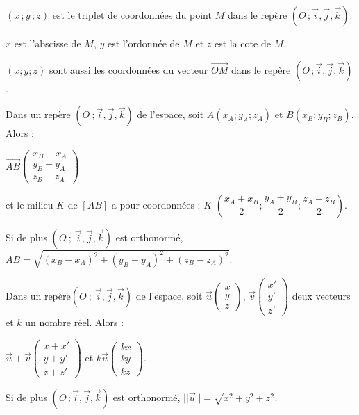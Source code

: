 \documentclass{cornouaille}
\begin{document}
\begin{definition}
  $(x\,;y\,;z)$ est le triplet de coordonnées du
  point $M$ dans le repère $(O\,;\vec{i},\vec{j},\vec{k})$.

  $x$ est l'abscisse de $M$, $y$ est l'ordonnée de $M$ et $z$ est la
  cote de $M$.  

  $(x;y;z)$ sont aussi les coordonnées du vecteur
  $\overrightarrow{OM}$ dans le repère
  $(O\,;\vec{i},\vec{j},\vec{k})$.
\end{definition}
 
\begin{proprietes}
  Dans un repère $(O\ ;\vec{i},\vec{j},\vec{k})$ de l'espace,
  soit $A(x_A;y_A;z_A)$  et $B(x_B;y_B;z_B)$.  Alors :

  $\overrightarrow{AB}\begin{pmatrix}x_B-x_A\\y_B-y_A\\z_B-z_A \end{pmatrix}$

  et le milieu $K$ de $[AB]$ a pour coordonnées :   $K$
  $(\dfrac{x_A+x_B}{2};\dfrac{y_A+y_B}{2} ;\dfrac{z_A+z_B}{2})$.

  \vspace{3mm}

  Si de plus $(O\ ;\ \vec{i},\vec{j},\vec{k})$ est orthonormé,
  $AB=\sqrt{(x_B-x_A)^2+(y_B-y_A)^2+(z_B-z_A)^2}$.
\end{proprietes}

\begin{proprietes}
  Dans un repère$(O\ ;\ \vec{i},\vec{j},\vec{k})$ de l'espace,
  soit $\vec{u}\begin {pmatrix} x\\y\\z \end{pmatrix}$,
  $\vec{v}\begin {pmatrix} x'\\y'\\z' \end{pmatrix}$ deux vecteurs et
  $k$ un nombre réel. Alors :

  $\vec{u}+\vec{v} \begin {pmatrix} x+x'\\y+y'\\z+z' \end{pmatrix}$ et
  $k \vec{u} \begin {pmatrix} kx\\ky\\kz \end{pmatrix}$.

  Si de plus $(O\,;\vec{i},\vec{j},\vec{k})$ est orthonormé,
  $||\vec{u}||=\sqrt{x^2+y^2+z^2}$.
\end{proprietes}
\end{document}
